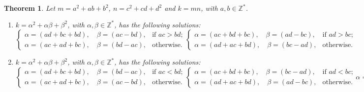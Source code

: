 \documentclass[reqno]{amsart}
\newtheorem{theorem}{Theorem}
\newcommand{\bq}[2]{\ensuremath{{#1}^2 + {#1}{#2} + {#2}^2}}
\newcommand{\bqab}{\bq{a}{b}}
\newcommand{\bqcd}{\bq{c}{d}}
\newcommand{\bqalbet}{\bq{\alpha}{\beta}}
\newcommand{\Nonnegative}{\ensuremath{\mathbb{Z^*}}}
\begin{document}
\begin{theorem}
  \label{th:BNumProduct}
  Let $m = \bqab$, $n = \bqcd$ and $k = mn$, with $a, b
  \in \Nonnegative$. 
  \begin{enumerate}
  \item $k = \bqalbet$, with $\alpha, \beta \in \Nonnegative$, has the following solutions:
    \begin{subequations}
      \begin{equation}
        \label{eq:Ident1}
        \begin{cases}
          \alpha = (ad + bc + bd), \quad \beta = (ac - bd), &
          \text{if $ac > bd$;}\\
          \alpha = (ac + ad + bc), \quad \beta = (bd - ac), &
          \text{otherwise.} 
        \end{cases}
      \end{equation}
      \begin{equation}
        \label{eq:Ident2}
        \begin{cases}
          \alpha = (ac + bd + bc), \quad \beta = (ad - bc), &
          \text{if } ad > bc; \\
          \alpha = (ad + ac + bd), \quad \beta = (bc - ad), &
          \text{otherwise.}
        \end{cases}
      \end{equation}
    \end{subequations}

  \item $k = \bqalbet$, with $\alpha, \beta \in \Nonnegative$, has the following solutions:
    \begin{subequations}
      \begin{equation}
        \label{eq:Ident3}     
        \begin{cases}
          \alpha = (ad + bc + bd), \quad \beta = (bd - ac), &
          \text{if $ac < bd$;}\\
          \alpha = (ac + ad + bc), \quad \beta = (ac - bd), &
          \text{otherwise.} 
        \end{cases}
      \end{equation}
      \begin{equation}
        \label{eq:Ident4}
        \begin{cases}
          \alpha = (ac + bd + bc), \quad \beta = (bc - ad), &
          \text{if $ad < bc$;} \\
          \alpha = (ad + ac + bd), \quad \beta = (ad - bc), &
          \text{otherwise.}
        \end{cases}
      \end{equation}    
      \begin{equation}
        \label{eq:Ident5}
        \alpha = (ad + bc + bd), \quad \beta = (ad + bc + ac).
      \end{equation}
      \begin{equation}
        \label{eq:Ident6}
        \alpha = (ac + bd + bc), \quad \beta = (ac + bd + ad).
      \end{equation}
    \end{subequations}
  \end{enumerate}
\end{theorem}
\end{document}
